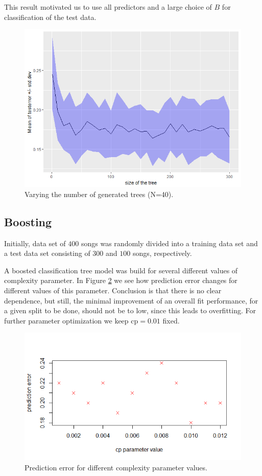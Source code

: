 \documentclass{article}
\begin{document}
This result motivated us to use all predictors and a large choice of $B$ for classification of the test data.

\begin{figure}[htp!]
  \centering
  \includegraphics[height=0.5\textwidth] {figs/treesize.png}
  \caption{Varying the number of generated trees (N=40).}
  \label{fig:treesize}
\end{figure}

\subsection{Boosting}

Initially, data set of $400$ songs was randomly divided into a training data set and a test data set consisting of $300$ and $100$ songs, respectively. 

A boosted classification tree model was build for several different values of complexity parameter. In Figure \ref{fig:complexity_parameter_values} we see how prediction error changes for different values of this parameter. Conclusion is that there is no clear dependence, but still, the minimal improvement of an overall fit performance, for a given split to be done, should not be to low, since this leads to overfitting. For further parameter optimization we keep {\selectfont cp$=0.01$} fixed.
 
 \begin{figure}[h] %
\includegraphics[scale=0.65]{figs/cp_values.png}
\centering
\caption{Prediction error for different complexity parameter values.} \label{fig:complexity_parameter_values}
\end{figure}
 
\end{document}

